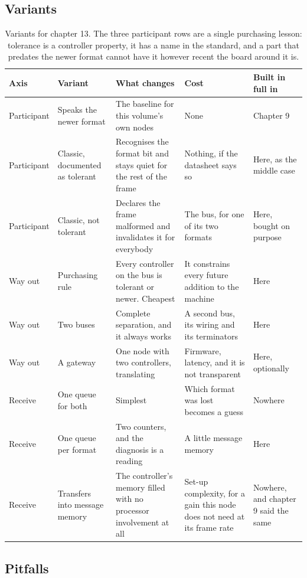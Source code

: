 \subsection*{Variants}

\begin{table}[H]\centering\small
\begin{tabular}{p{24mm}p{26mm}p{44mm}p{22mm}p{20mm}}
\toprule
Axis & Variant & What changes & Cost & Built in full in \\
\midrule
Participant & Speaks the newer format & The baseline for this volume's own nodes & None & Chapter 9 \\
Participant & Classic, documented as tolerant & Recognises the format bit and stays quiet for the rest of the frame & Nothing, if the datasheet says so & Here, as the middle case \\
Participant & Classic, not tolerant & Declares the frame malformed and invalidates it for everybody & The bus, for one of its two formats & Here, bought on purpose \\
Way out & Purchasing rule & Every controller on the bus is tolerant or newer. Cheapest & It constrains every future addition to the machine & Here \\
Way out & Two buses & Complete separation, and it always works & A second bus, its wiring and its terminators & Here \\
Way out & A gateway & One node with two controllers, translating & Firmware, latency, and it is not transparent & Here, optionally \\
Receive & One queue for both & Simplest & Which format was lost becomes a guess & Nowhere \\
Receive & One queue per format & Two counters, and the diagnosis is a reading & A little message memory & Here \\
Receive & Transfers into message memory & The controller's memory filled with no processor involvement at all & Set-up complexity, for a gain this node does not need at its frame rate & Nowhere, and chapter 9 said the same \\
\bottomrule
\end{tabular}
\caption{Variants for chapter 13. The three participant rows are a single purchasing lesson: tolerance is a controller property, it has a name in the standard, and a part that predates the newer format cannot have it however recent the board around it is.}
\end{table}

\subsection*{Pitfalls}

